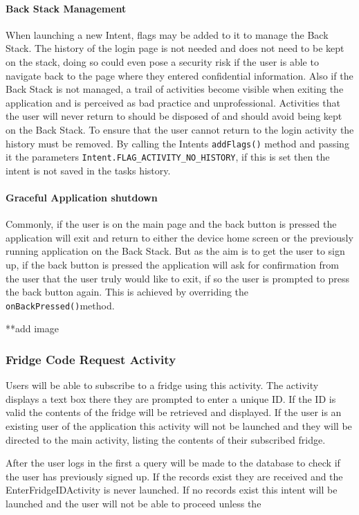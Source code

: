 \documentclass[a4paper, 11pt]{article}
\begin{document}
\paragraph{Back Stack Management}
When launching a new Intent, flags may be added to it to manage the Back Stack. The history of the login page is not needed and does not need to be kept on the stack, doing so could even pose a security risk if the user is able to navigate back to the page where they entered confidential information. Also if the Back Stack is not managed, a trail of activities become visible when exiting the application and is perceived as bad practice and unprofessional. Activities that the user will never return to should be disposed of and should avoid being kept on the Back Stack. To ensure that the user cannot return to the login activity the history must be removed. By calling the Intents \texttt{addFlags()} method and passing it the parameters \texttt{Intent.FLAG\_ACTIVITY\_NO\_HISTORY}, if this is set then the intent is not saved in the tasks history.


\paragraph{Graceful Application shutdown}
Commonly, if the user is on the main page and the back button is pressed the application will exit and return to either the device home screen or the previously running application on the Back Stack. But as the aim is to get the user to sign up, if the back button is pressed the application will ask for confirmation from the user that the user truly would like to exit, if so the user is prompted to press the back button again. This is achieved by overriding the \texttt{onBackPressed()}method. 

**add image


\subsubsection{Fridge Code Request Activity}
Users will be able to subscribe to a fridge using this activity. The activity displays a text box there they are prompted to enter a unique ID. If the ID is valid the contents of the fridge will be retrieved and displayed. If the user is an existing user of the application this activity will not be launched and they will be directed to the main activity, listing the contents of their subscribed fridge.

After the user logs in the first a query will be made to the database to check if the user has previously signed up. If the records exist they are received and the EnterFridgeIDActivity is never launched. If no records exist this intent will be launched and the user will not be able to proceed unless the 
\end{document}
